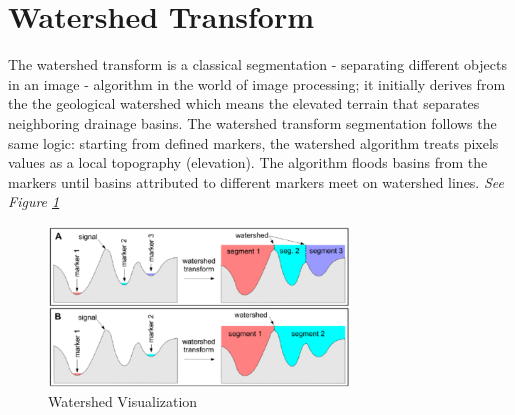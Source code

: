 \documentclass{article}
\begin{document}
\section{Watershed Transform}
\vspace{2mm}
\begin{flushleft}
The watershed transform is a classical segmentation - separating different objects in an image - algorithm in the world of image processing; it initially derives from the the geological watershed which means the elevated terrain that separates neighboring drainage basins. The watershed transform segmentation follows the same logic: starting from defined markers, the watershed algorithm treats pixels values as a local topography (elevation). The algorithm floods basins from the markers until basins attributed to different markers meet on watershed lines. \textit{See Figure \ref{fig:watershed_visualization}}\newline
\vspace{2mm}
\end{flushleft}
\begin{figure}[ht]
    \centering
    \includegraphics[width=8cm]{watershed.png}
    \caption{Watershed Visualization}
    \label{fig:watershed_visualization}
\end{figure}
\end{document}
